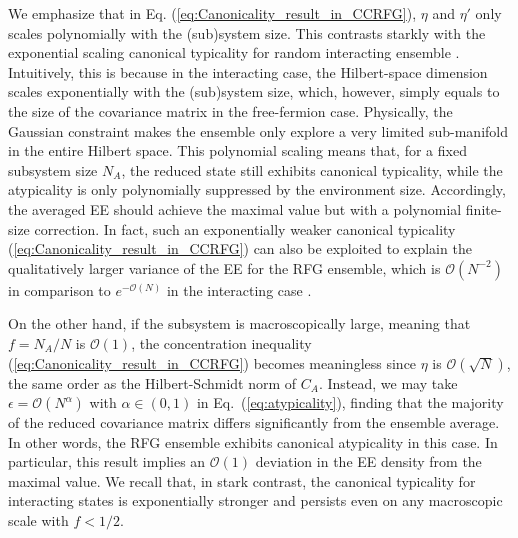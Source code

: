 \documentclass[twocolumn,english,prl,aps,superscriptaddress,amsmath,amssymb,floatfix]{revtex4-2}
\begin{document}
We emphasize that in Eq. (\ref{eq:Canonicality_result_in_CCRFG}),
$\eta$ and $\eta'$ only scales polynomially with the (sub)system size. %
This contrasts starkly with the exponential scaling canonical typicality %
for random interacting %
ensemble \citep{Popescu2006}. %
Intuitively, this is because in the interacting %
case, the %
Hilbert-space dimension scales exponentially with the (sub)system size, %
which, however, simply equals to the size %
of the covariance matrix in the free-fermion case. %
Physically, the Gaussian constraint %
makes the ensemble
only explore a very limited sub-manifold in the entire %
Hilbert space.
This polynomial scaling means that, for a fixed subsystem size $N_A$, the reduced state still exhibits canonical typicality, while the atypicality is only polynomially suppressed by the environment size. Accordingly, the averaged EE should achieve the maximal value but with a polynomial finite-size correction. In fact, such an exponentially weaker canonical typicality (\ref{eq:Canonicality_result_in_CCRFG}) can also be exploited to explain the qualitatively larger variance of the EE for the RFG ensemble, which is $\mathcal{O}(N^{-2})$ %
in comparison to  
$e^{-\mathcal{O}(N)}$ in the interacting case %
\citep{Bianchi2021a,Bianchi2021,SM}.  

On the other hand, %
if the subsystem is macroscopically large, meaning that $f=N_A/N$ is $\mathcal{O}(1)$, the concentration inequality (\ref{eq:Canonicality_result_in_CCRFG}) becomes meaningless since $\eta$ is $\mathcal{O}(\sqrt{N})$, the same order as the Hilbert-Schmidt norm of $C_A$. Instead, we may take $\epsilon=\mathcal{O}(N^\alpha)$ with $\alpha\in(0,1)$ in Eq.~(\ref{eq:atypicality}), finding that the majority of the reduced covariance matrix differs significantly from the ensemble average. In other words, the RFG ensemble exhibits canonical atypicality in this case. In particular, this result implies an $\mathcal{O}(1)$ deviation in the EE density from the maximal value. We recall that, in stark contrast, the canonical typicality for interacting states is exponentially stronger and persists even on any macroscopic scale with $f<1/2$. %
\end{document}
